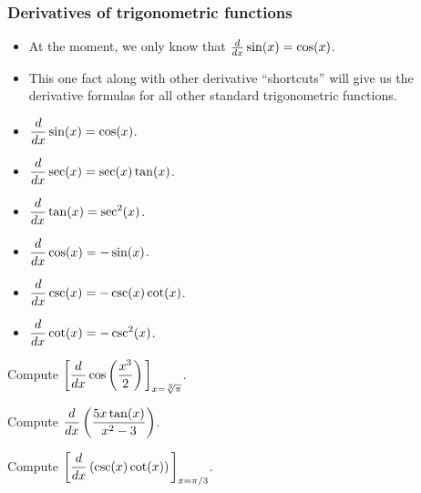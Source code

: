\documentclass[10pt,t,presentation,ignorenonframetext,aspectratio=169]{beamer}
\begin{document}
\begin{frame}
  \frametitle{Derivatives of trigonometric functions}
  \begin{itemize}
  \item At the moment, we only know that $\frac{d}{\mathop{}\!d x} \sin(x) = \cos(x)$.
  \item This one fact along with other derivative {``shortcuts''} will
    give us the derivative formulas for all other standard trigonometric
    functions.
  \end{itemize}

  \begin{thm} \hfill
    \begin{multicols}{2}
      \begin{itemize}
      \item $\displaystyle \frac{d}{\mathop{}\!d x} \sin(x) = \cos(x)$.
      \item $\displaystyle \frac{d}{\mathop{}\!d x} \sec(x) = \sec(x)\tan(x)$.
      \item $\displaystyle \frac{d}{\mathop{}\!d x} \tan(x) = \sec^2(x)$.
      \item $\displaystyle \frac{d}{\mathop{}\!d x} \cos(x) = -\sin(x)$.
      \item $\displaystyle \frac{d}{\mathop{}\!d x} \csc(x) = -\csc(x)\cot(x)$.
      \item $\displaystyle \frac{d}{\mathop{}\!d x} \cot(x) = -\csc^2(x)$.
      \end{itemize}
    \end{multicols}
    \vspace{0.5em}
  \end{thm}

\end{frame}

\begin{frame}
  \vs
  \question{} Compute $\displaystyle \bigg[ \frac{d}{\mathop{}\!d x} \cos \left( \frac{x^3}{2}
      \right) \bigg]_{x=\sqrt[3]{\pi}}$.
\end{frame}

\begin{frame}
  \vs
  \question{} Compute $\displaystyle \frac{d}{\mathop{}\!d x} \left( \frac{5x \tan(x)}{x^2-3} \right)$.
\end{frame}

\begin{frame}
  \vs
  \question{} Compute $\displaystyle \bigg[ \frac{d}{\mathop{}\!d x} \left( \csc(x)\cot(x) \right) \bigg]_{x=\pi/3}$.
\end{frame}
\end{document}
